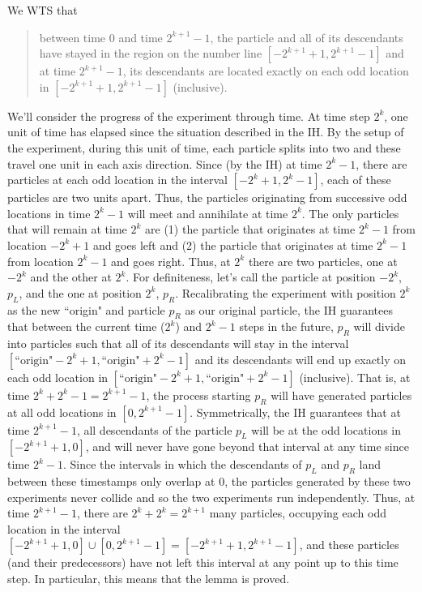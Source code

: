 \documentclass[12pt, oneside]{article}
\begin{document}
\begin{description}
{{\begin{itemize}
    We WTS that
    \begin{quote}
      between time $0$ and time $2^{k+1}-1$, 
      the particle and all of its descendants have stayed in the region on the number 
      line $[-2^{k+1}+1, 2^{k+1}-1]$ and at time $2^{k+1}-1$, 
      its descendants are located exactly
      on each odd location in $[-2^{k+1}+1,2^{k+1}-1]$ (inclusive).
    \end{quote}
    We'll consider the progress of the experiment through time.  At time step
    $2^k$, one unit of time has elapsed since the situation described in the IH.
    By the setup of the experiment, during this unit of time, each particle splits into
    two and these travel one unit in each axis direction.  Since (by the IH) 
    at time $2^k-1$, there are particles
    at each odd location in the interval $[-2^{k}+1,2^k-1]$, each of these particles
    are two units apart.  Thus, the particles originating from successive
    odd locations in time $2^{k}-1$ will meet and annihilate at time $2^k$. 
    The only particles that will remain at time $2^k$ are (1) the particle that originates
    at time $2^k-1$ from location $-2^k +1$ and goes left and (2) the particle that 
    originates at time $2^k-1$ from location $2^k-1$ and goes right.  Thus, 
    at $2^k$ there are two particles, one at $-2^k$ and the other at $2^k$.
    For definiteness, let's call the particle at position $-2^k$, $p_L$, and the one
    at position $2^k$, $p_R$.    Recalibrating the experiment with position $2^k$ as
    the new ``origin" and particle $p_R$ as our original particle, the IH guarantees that 
    between the current time ($2^k$) and $2^k-1$ steps in the future, $p_R$ will
    divide into particles such that all of its descendants 
    will stay in the interval $[\text{``origin"}-2^{k}+1, \text{``origin"}+2^{k}-1]$ 
    and  its descendants will end up exactly
    on each odd location in $[\text{``origin"}-2^{k}+1, \text{``origin"}+2^{k}-1]$
    (inclusive).  That is, at time $2^k+2^k-1 = 2^{k+1}-1$, the process 
    starting $p_R$ will have generated particles at all odd locations
    in $[0, 2^{k+1}-1]$.  Symmetrically, the IH guarantees that at time $2^{k+1}-1$,
    all descendants of the particle $p_L$  will be at the odd locations in
    $[-2^{k+1}+1, 0]$, and will never have gone beyond that interval at any time 
    since 
    time $2^{k}-1$.  Since the intervals in which the descendants of $p_L$ and 
    $p_R$ land between these timestamps only overlap at $0$, the particles
    generated by these two experiments never collide and so the two 
    experiments run independently.  Thus, at time $2^{k+1}-1$, there
    are $2^k + 2^k = 2^{k+1}$ many particles, occupying each odd location in the interval
    $[-2^{k+1}+1, 0] \cup [0, 2^{k+1}-1] = [-2^{k+1}+1, 2^{k+1}-1]$, and 
    these particles (and their predecessors) have not left this interval at any point 
    up to this time step.  In particular, this means that the lemma is proved.
  \end{itemize} }}
\else{}
\fi


\end{description}
\end{document}
